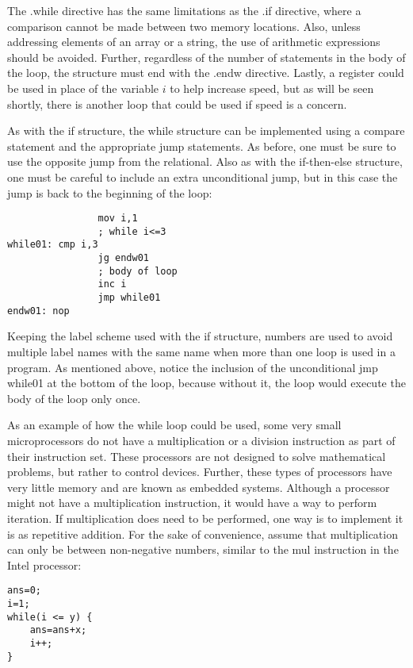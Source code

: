 \documentclass[10pt]{article}
\begin{document}
The .while directive has the same limitations as the .if directive, where a comparison cannot be made between two memory locations. Also, unless addressing elements of an array or a string, the use of arithmetic expressions should be avoided. Further, regardless of the number of statements in the body of the loop, the structure must end with the .endw directive. Lastly, a register could be used in place of the variable $i$ to help increase speed, but as will be seen shortly, there is another loop that could be used if speed is a concern.

As with the if structure, the while structure can be implemented using a compare statement and the appropriate jump statements. As before, one must be sure to use the opposite jump from the relational. Also as with the if-then-else structure, one must be careful to include an extra unconditional jump, but in this case the jump is back to the beginning of the loop:

\begin{verbatim}
                mov i,1
                ; while i<=3
while01: cmp i,3
                jg endw01
                ; body of loop
                inc i
                jmp while01
endw01: nop
\end{verbatim}

Keeping the label scheme used with the if structure, numbers are used to avoid multiple label names with the same name when more than one loop is used in a program. As mentioned above, notice the inclusion of the unconditional jmp while01 at the bottom of the loop, because without it, the loop would execute the body of the loop only once.

As an example of how the while loop could be used, some very small microprocessors do not have a multiplication or a division instruction as part of their instruction set. These processors are not designed to solve mathematical problems, but rather to control devices. Further, these types of processors have very little memory and are known as embedded systems. Although a processor might not have a multiplication instruction, it would have a way to perform iteration. If multiplication does need to be performed, one way is to implement it is as repetitive addition. For the sake of convenience, assume that multiplication can only be between non-negative numbers, similar to the mul instruction in the Intel processor:

\begin{verbatim}
ans=0;
i=1;
while(i <= y) {
    ans=ans+x;
    i++;
}
\end{verbatim}
\end{document}
